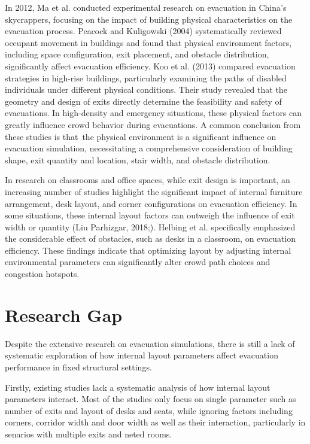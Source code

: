 In 2012, Ma et al. conducted experimental research on evacuation in China's skycrappers, focusing on the impact of building physical characteristics on the evacuation process. Peacock and Kuligowski (2004) systematically reviewed occupant movement in buildings and found that physical environment factors, including space configuration, exit placement, and obstacle distribution, significantly affect evacuation efficiency. Koo et al. (2013) compared evacuation strategies in high-rise buildings, particularly examining the paths of disabled individuals under different physical conditions. Their study revealed that the geometry and design of exits directly determine the feasibility and safety of evacuations. In high-density and emergency situations, these physical factors can greatly influence crowd behavior during evacuations. A common conclusion from these studies is that the physical environment is a significant influence on evacuation simulation, necessitating a comprehensive consideration of building shape, exit quantity and location, stair width, and obstacle distribution.

In research on classrooms and office spaces, while exit design is important, an increasing number of studies highlight the significant impact of internal furniture arrangement, desk layout, and corner configurations on evacuation efficiency. In some situations, these internal layout factors can outweigh the influence of exit width or quantity (Liu Parhizgar, 2018;). Helbing et al. specifically emphasized the considerable effect of obstacles, such as desks in a classroom, on evacuation efficiency. These findings indicate that optimizing layout by adjusting internal environmental parameters can significantly alter crowd path choices and congestion hotspots.

\section{Research Gap}
Despite the extensive research on evacuation simulations, there is still a lack of systematic exploration of how internal layout parameters affect evacuation performance in fixed structural settings. 

Firstly, existing studies lack a systematic analysis of how internal layout parameters interact. Most of the studies only focus on single parameter such as number of exits and layout of desks and seats, while ignoring factors including corners, corridor width and door width as well as their interaction, particularly in senarios with multiple exits and neted rooms.


